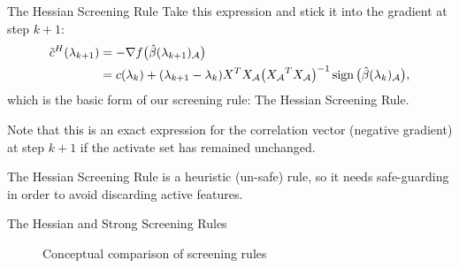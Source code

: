 \documentclass[10pt,ignorenonframetext]{beamer}
\begin{document}
\begin{frame}{The Hessian Screening Rule}
  Take this expression and stick it into the gradient at step \(k +
  1\):
  \begin{equation*}
    \begin{aligned}
      \tilde c^H(\lambda_{k+1})
       & = -\nabla f\big(\hat\beta(\lambda_{k+1})_\mathcal{A}\big)       \\
       & = c(\lambda_k) + (\lambda_{k+1} - \lambda_k)X^T {X_\mathcal{A}}
      \big({X_\mathcal{A}}^T{X_\mathcal{A}}\big)^{-1}
      \operatorname{sign}\big(\hat\beta(\lambda_k)_\mathcal{A}\big),
    \end{aligned}
  \end{equation*}
  which is the basic form of our screening rule: \alert{The Hessian Screening
    Rule}. \medskip

  Note that this is an exact expression for the correlation vector (negative
  gradient) at step \(k+1\) if the activate set has remained unchanged.\medskip

  The Hessian Screening Rule is a heuristic (un-safe) rule, so it needs safe-guarding
  in order to avoid discarding active features.
\end{frame}

\begin{frame}{The Hessian and Strong Screening Rules}
  \begin{figure}
    
    \caption{Conceptual comparison of screening rules}
  \end{figure}
\end{frame}




\end{document}
